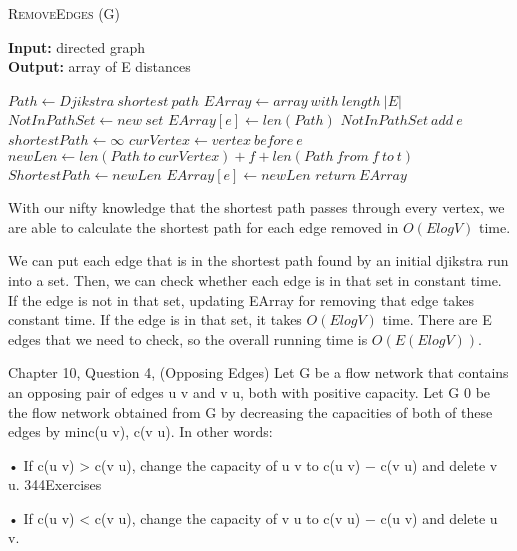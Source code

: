 \documentclass{article}
\begin{document}
\begin{algorithm} \caption{\textsc{RemoveEdges} (G)}\label{alg:seb}
    {\bf Input:} directed graph\\
    {\bf Output:} array of E distances
    \begin{algorithmic}[1]
        \State$Path \gets Djikstra\ shortest\ path$
        \State$EArray \gets array\ with\ length\ |E|$
        \State$NotInPathSet \gets new\ set$
                \State$EArray[e] \gets len(Path)$
            \Else{}
                \State$NotInPathSet\ add\ e$
            \EndIf{}
        \EndFor{}
            \State$shortestPath \gets \infty$
            \State$curVertex \gets vertex\ before\ e$
            \State$newLen \gets len(Path\ to\ curVertex) + f + len(Path\ from\ f\ to\ t) $
                \State$ShortestPath \gets newLen$
                \EndIf{}
                \State$EArray[e] \gets newLen$
            \EndFor{}
        \EndFor{}
        \State$return\ EArray$
    \end{algorithmic}
\end{algorithm}

With our nifty knowledge that the shortest path passes through every vertex, we
are able to calculate the shortest path for each edge removed in $O(E log V)$ time.

We can put each edge that is in the shortest path found by an initial djikstra run into a set. Then, we can check whether each edge is in that set in constant time. If the edge is not in that set, updating EArray for removing that edge takes constant time. If the edge is in that set, it takes $O(E log V)$ time. There are E edges that we need to check, so the overall running time is $O(E (E log V))$.

\collab{\todo{}}
\nextprob{}

Chapter 10, Question 4, (Opposing Edges)
Let G be a flow network that contains an opposing pair of edges u  v and
v  u, both with positive capacity. Let G 0 be the flow network obtained from G
by decreasing the capacities of both of these edges by min{c(u  v), c(v  u)}.
In other words:

• If c(u  v) > c(v  u), change the capacity of u  v to c(u  v) − c(v  u)
and delete v  u.
344Exercises

• If c(u  v) < c(v  u), change the capacity of v  u to c(v  u) − c(u  v)
and delete u  v.
\end{document}
